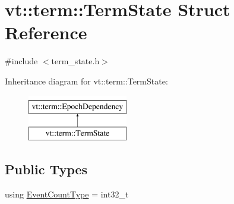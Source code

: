 \hypertarget{structvt_1_1term_1_1_term_state}{}\section{vt\+:\+:term\+:\+:Term\+State Struct Reference}
\label{structvt_1_1term_1_1_term_state}


{\ttfamily \#include $<$term\+\_\+state.\+h$>$}

Inheritance diagram for vt\+:\+:term\+:\+:Term\+State\+:\begin{figure}[H]
\begin{center}
\leavevmode
\includegraphics[height=2.000000cm]{structvt_1_1term_1_1_term_state}
\end{center}
\end{figure}
\subsection*{Public Types}
\begin{DoxyCompactItemize}
\item 
using \hyperlink{structvt_1_1term_1_1_term_state_a900fe4e9d98c81a320ae1dca27b71c2c}{Event\+Count\+Type} = int32\+\_\+t
\end{DoxyCompactItemize}
